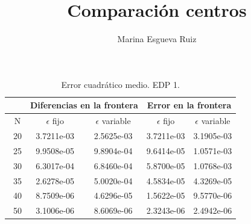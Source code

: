 \documentclass[11pt,a4paper]{article}
\author{Marina Esgueva Ruiz}
\title{Comparación centros}
\begin{document}
\begin{table}
\caption{Error cuadrático medio. EDP 1.}
\centering
\begin{tabular}{|c|cc|cc|}
\hline
\   & \multicolumn{2}{c|}{Diferencias en la frontera} & \multicolumn{2}{c|}{Error en la frontera} \\
\hline
\ N & $\epsilon$ fijo & $\epsilon$ variable & $\epsilon$ fijo & $\epsilon$ variable \\
\hline
\ 20 & 3.7211e-03&  2.5625e-03 & 3.7211e-03 & 3.1905e-03 \\
\ 25 &  9.9508e-05 & 9.8904e-04& 9.6414e-05 & 1.0571e-03 \\
\ 30 &  6.3017e-04 &6.8460e-04 & 5.8700e-05 & 1.0768e-03\\
\ 35 & 2.6278e-05 & 5.0020e-04 & 4.5834e-05&  4.3269e-05 \\
\ 40& 8.7509e-06 &4.6296e-05& 1.5622e-05 &9.5770e-06\\
\ 50& 3.1006e-06& 8.6069e-06 & 2.3243e-06 &  2.4942e-06\\
\hline
\end{tabular}
\end{table}
\end{document}
